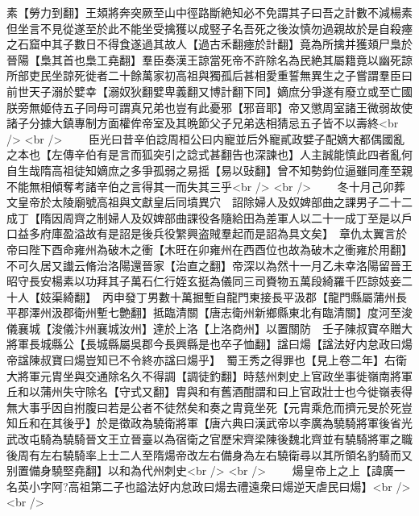 素【勞力到翻】王頍將奔突厥至山中徑路斷絶知必不免謂其子曰吾之計數不減楊素但坐言不見從遂至於此不能坐受擒獲以成竪子名吾死之後汝慎勿過親故於是自殺瘞之石窟中其子數日不得食遂過其故人【過古禾翻瘞於計翻】竟為所擒并獲頍尸梟於晉陽【梟其首也梟工堯翻】羣臣奏漢王諒當死帝不許除名為民絶其屬籍竟以幽死諒所部吏民坐諒死徙者二十餘萬家初高祖與獨孤后甚相愛重誓無異生之子嘗謂羣臣曰前世天子溺於嬖幸【溺奴狄翻嬖卑義翻又博計翻下同】嫡庶分爭遂有廢立或至亡國朕旁無姬侍五子同母可謂真兄弟也豈有此憂邪【邪音耶】帝又懲周室諸王微弱故使諸子分據大鎮專制方面權侔帝室及其晩節父子兄弟迭相猜忌五子皆不以壽終<br />
<br />
　　臣光曰昔辛伯諗周桓公曰内寵並后外寵貳政嬖子配嫡大都偶國亂之本也【左傳辛伯有是言而狐突引之諗式甚翻告也深諫也】人主誠能慎此四者亂何自生哉隋高祖徒知嫡庶之多爭孤弱之易摇【易以䜴翻】曾不知勢鈞位逼雖同產至親不能無相傾奪考諸辛伯之言得其一而失其三乎<br />
<br />
　　冬十月己卯葬文皇帝於太陵廟號高祖與文獻皇后同墳異穴　詔除婦人及奴婢部曲之課男子二十二成丁【隋因周齊之制婦人及奴婢部曲課役各隨給田為差軍人以二十一成丁至是以戶口益多府庫盈溢故有是詔是後兵役䌓興盗賊羣起而是詔為具文矣】　章仇太翼言於帝曰陛下酉命雍州為破木之衝【木旺在卯雍州在西酉位也故為破木之衝雍於用翻】不可久居又䜟云脩治洛陽還晉家【治直之翻】帝深以為然十一月乙未幸洛陽留晉王昭守長安楊素以功拜其子萬石仁行姪玄挺為儀同三司賚物五萬段綺羅千匹諒妓妾二十人【妓渠綺翻】　丙申發丁男數十萬掘塹自龍門東接長平汲郡【龍門縣屬蒲州長平郡澤州汲郡衛州塹七艶翻】抵臨清關【唐志衛州新鄉縣東北有臨清關】度河至浚儀襄城【浚儀汴州襄城汝州】達於上洛【上洛商州】以置關防　壬子陳叔寶卒贈大將軍長城縣公【長城縣屬吳郡今長興縣是也卒子恤翻】諡曰煬【諡法好内怠政曰煬帝諡陳叔寶曰煬豈知已不令終亦諡曰煬乎】　蜀王秀之得罪也【見上卷二年】右衛大將軍元胄坐與交通除名久不得調【調徒釣翻】時慈州刺史上官政坐事徙嶺南將軍丘和以蒲州失守除名【守式又翻】胄與和有舊酒酣謂和曰上官政壯士也今徙嶺表得無大事乎因自拊腹曰若是公者不徒然矣和奏之胄竟坐死【元胄乘危而擠元旻於死豈知丘和在其後乎】於是徵政為驍衛將軍【唐六典曰漢武帝以李廣為驍騎將軍後省光武改屯騎為驍騎晉文王立晉臺以為宿衛之官歷宋齊梁陳後魏北齊並有驍騎將軍之職後周有左右驍騎率上士二人至隋煬帝改左右備身為左右驍衛尋以其所領名豹騎而又别置備身驍堅堯翻】以和為代州刺史<br />
<br />
　　煬皇帝上之上【諱廣一名英小字阿?高祖第二子也謚法好内怠政曰煬去禮遠衆曰煬逆天虐民曰煬】<br />
<br />
